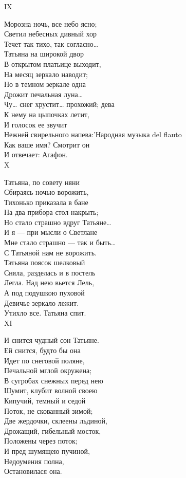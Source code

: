 IX

Морозна ночь, все небо ясно;\\
Светил небесных дивный хор\\
Течет так тихо, так согласно…\\
Татьяна на широкой двор\\
В открытом платьице выходит,\\
На месяц зеркало наводит;\\
Но в темном зеркале одна\\
Дрожит печальная луна…\\
Чу… снег хрустит… прохожий; дева\\
К нему на цыпочках летит,\\
И голосок ее звучит\\
Нежней свирельного напева:\marginnote'{Народная музыка del flauto}\\
Как ваше имя? Смотрит он\\
И отвечает: Агафон.\\

X

Татьяна, по совету няни\\
Сбираясь ночью ворожить,\\
Тихонько приказала в бане\\
На два прибора стол накрыть;\\
Но стало страшно вдруг Татьяне…\\
И я — при мысли о Светлане\\
Мне стало страшно — так и быть…\\
С Татьяной нам не ворожить.\\
Татьяна поясок шелковый\\
Сняла, разделась и в постель\\
Легла. Над нею вьется Лель,\\
А под подушкою пуховой\\
Девичье зеркало лежит.\\
Утихло все. Татьяна спит.\\

XI

И снится чудный сон Татьяне.\\
Ей снится, будто бы она\\
Идет по снеговой поляне,\\
Печальной мглой окружена;\\
В сугробах снежных перед нею\\
Шумит, клубит волной своею\\
Кипучий, темный и седой\\
Поток, не скованный зимой;\\
Две жердочки, склеены льдиной,\\
Дрожащий, гибельный мосток,\\
Положены через поток;\\
И пред шумящею пучиной,\\
Недоумения полна,\\
Остановилася она.\\

